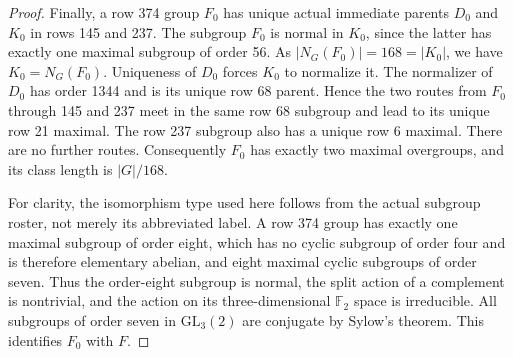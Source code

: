 \documentclass[11pt,a4paper]{article}
\begin{document}
\begin{proof}
Finally, a row 374 group $F_0$ has unique actual immediate parents
$D_0$ and $K_0$ in rows 145 and 237. The subgroup $F_0$ is normal
in $K_0$, since the latter has exactly one maximal subgroup of
order 56. As $|N_G(F_0)|=168=|K_0|$, we have $K_0=N_G(F_0)$.
Uniqueness of $D_0$ forces $K_0$ to normalize it. The normalizer
of $D_0$ has order 1344 and is its unique row 68 parent. Hence the
two routes from $F_0$ through 145 and 237 meet in the same row 68
subgroup and lead to its unique row 21 maximal. The row 237 subgroup
also has a unique row 6 maximal. There are no further routes.
Consequently $F_0$ has exactly two maximal overgroups, and its
class length is $|G|/168$.

For clarity, the isomorphism type used here follows from the actual
subgroup roster, not merely its abbreviated label. A row 374 group
has exactly one maximal subgroup of order eight, which has no
cyclic subgroup of order four and is therefore elementary abelian,
and eight maximal cyclic subgroups of order seven. Thus the order-eight
subgroup is normal, the split action of a complement is nontrivial,
and the action on its three-dimensional $\mathbb F_2$ space is
irreducible. All subgroups of order seven in $\mathrm{GL}_3(2)$ are
conjugate by Sylow's theorem. This identifies $F_0$ with $F$.
\end{proof}
\end{document}
